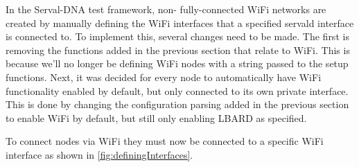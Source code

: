 In the Serval-DNA test framework, non- fully-connected WiFi networks are created by manually defining the WiFi interfaces that a specified servald interface is connected to.
To implement this, several changes need to be made.
The first is removing the functions added in the previous section that relate to WiFi.
This is because we'll no longer be defining WiFi nodes with a string passed to the setup functions.
Next, it was decided for every node to automatically have WiFi functionality enabled by default, but only connected to its own private interface. 
This is done by changing the configuration parsing added in the previous section to enable WiFi by default, but still only enabling LBARD as specified.

To connect nodes via WiFi they must now be connected to a specific WiFi interface as shown in \figurename{ \ref{fig:definingInterfaces}}.

